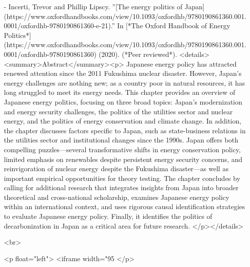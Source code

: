 - Incerti, Trevor and Phillip Lipscy. ''[The energy politics of Japan](https://www.oxfordhandbooks.com/view/10.1093/oxfordhb/9780190861360.001.0001/oxfordhb-9780190861360-e-21).'' In [*The Oxford Handbook of Energy Politics*](https://www.oxfordhandbooks.com/view/10.1093/oxfordhb/9780190861360.001.0001/oxfordhb-9780190861360) (2020). (*Peer reviewed*). 
  <details><summary>Abstract</summary><p> Japanese energy policy has attracted renewed attention since the 2011 Fukushima nuclear disaster. However, Japan’s energy challenges are nothing new; as a country poor in natural resources, it has long struggled to meet its energy needs. This chapter provides an overview of Japanese energy politics, focusing on three broad topics: Japan’s modernization and energy security challenges, the politics of the utilities sector and nuclear energy, and the politics of energy conservation and climate change. In addition, the chapter discusses factors specific to Japan, such as state-business relations in the utilities sector and institutional changes since the 1990s. Japan offers both compelling puzzles—several transformative shifts in energy conservation policy, limited emphasis on renewables despite persistent energy security concerns, and reinvigoration of nuclear energy despite the Fukushima disaster—as well as important empirical opportunities for theory testing. The chapter concludes by calling for additional research that integrates insights from Japan into broader theoretical and cross-national scholarship, examines Japanese energy policy within an international context, and uses rigorous causal identification strategies to evaluate Japanese energy policy. Finally, it identifies the politics of decarbonization in Japan as a critical area for future research. </p></details>
  
<br>

 <p float="left">
   <iframe width="95%
</p>



